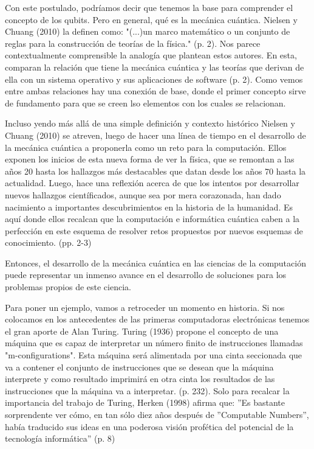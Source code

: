 \documentclass[11pt,a4paper]{article}
\begin{document}
Con este postulado, podríamos decir que tenemos la base para comprender el concepto de los qubits. Pero en general, qué es la mecánica cuántica. Nielsen y Chuang (2010) la definen como: "(...)un marco matemático o un conjunto de reglas para la construcción de teorías de la física." (p. 2). Nos parece contextualmente comprensible la analogía que plantean estos autores. En esta, comparan la relación que tiene la mecánica cuántica y las teorías que derivan de ella con un sistema operativo y sus aplicaciones de software (p. 2). Como vemos entre ambas relaciones hay una conexión de base, donde el primer concepto sirve de fundamento para que se creen lso elementos con los cuales se relacionan.

Incluso yendo más allá de una simple definición y contexto histórico Nielsen y Chuang (2010) se atreven, luego de hacer una línea de tiempo en el desarrollo de la mecánica cuántica a proponerla como un reto para la computación. Ellos exponen los inicios de esta nueva forma de ver la física, que se remontan a las años 20 hasta los hallazgos más destacables que datan desde los años 70 hasta la actualidad. Luego, hace una reflexión acerca de que los intentos por desarrollar nuevos hallazgos científicados, aunque sea por mera corazonada, han dado nacimiento a importantes descubrimientos en la historia de la humanidad. Es aquí donde ellos recalcan que la computación e informática cuántica caben a la perfección en este esquema de resolver retos propuestos por nuevos esquemas de conocimiento. (pp. 2-3)

Entonces, el desarrollo de la mecánica cuántica en las ciencias de la computación puede representar un inmenso avance en el desarrollo de soluciones para los problemas propios de este ciencia. 

Para poner un ejemplo, vamos a retroceder un momento en historia. Si nos colocamos en los antecedentes de las primeras computadoras electrónicas tenemos el gran aporte de Alan Turing. Turing (1936) propone el concepto de una máquina que es capaz de interpretar un número finito de instrucciones llamadas "m-configurations". Esta máquina será alimentada por una cinta seccionada que va a contener el conjunto de instrucciones que se desean que la máquina interprete y como resultado imprimirá en otra cinta los resultados de las instrucciones que la máquina va a interpretar. (p. 232). Solo para recalcar la importancia del trabajo de Turing, Herken (1998) afirma que: ''Es bastante sorprendente ver cómo, en tan sólo diez años después de ''Computable Numbers'', había traducido sus ideas en una poderosa visión profética del potencial de la tecnología informática'' (p. 8) 
\end{document}
